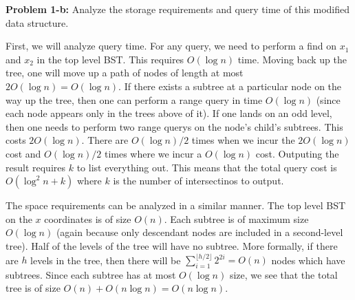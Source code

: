 \documentclass[psamsfonts]{amsart}
\newenvironment{sol}{\vspace{0.25cm}{\large \bfseries Solution:}}{\qedsymbol}
\newenvironment{prob}[1]{\begin{framed}{\large \bfseries Problem #1:}}{\end{framed}}
\begin{document}
\begin{prob}{1-b}
Analyze the storage requirements and query time of this modified data structure.
\end{prob}
\begin{sol}
First, we will analyze query time. For any query, we need to perform a find on $x_1$ and $x_2$ in the top level BST. This requires $O(\log n)$ time. Moving back up the tree, one will move up a path of nodes of length at most $2 O(\log n) = O(\log n)$. If there exists a subtree at a particular node on the way up the tree, then one can perform a range query in time $O(\log n)$ (since each node appears only in the trees above of it). If one lands on an odd level, then one needs to perform two range querys on the node's child's subtrees. This costs $2 O(\log n)$. There are $O(\log n)/2$ times when we incur the $2 O(\log n)$ cost and $O(\log n)/2$ times where we incur a $O(\log n)$ cost. Outputing the result requires $k$ to list everything out. This means that the total query cost is $O(\log^2 n + k)$ where $k$ is the number of intersectinos to output.

The space requirements can be analyzed in a similar manner. The top level BST on the $x$ coordinates is of size $O(n)$. Each subtree is of maximum size $O(\log n)$ (again because only descendant nodes are included in a second-level tree). Half of the levels of the tree will have no subtree. More formally, if there are $h$ levels in the tree, then there will be $\sum_{i=1}^{\lfloor h/2 \rfloor} 2^{2i} = O(n)$ nodes which have subtrees. Since each subtree has at most $O(\log n)$ size, we see that the total tree is of size $O(n) + O(n \log n) = O(n \log n)$.  
\end{sol}
\end{document}
